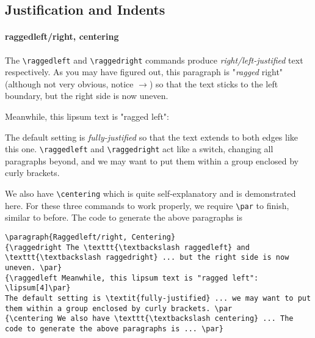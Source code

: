 \subsection{Justification and Indents}

\paragraph{raggedleft/right, centering}
{\raggedright The \texttt{\textbackslash raggedleft} and \texttt{\textbackslash raggedright} commands produce \textit{right/left-justified} text respectively. As you may have figured out, this paragraph is "\textit{ragged} right" (although not very obvious, notice $\rightarrow$) so that the text sticks to the left boundary, but the right side is now uneven. \par}
{\raggedleft Meanwhile, this lipsum text is "ragged left": \lipsum[4]\par}
The default setting is \textit{fully-justified} so that the text extends to both edges like this one. \texttt{\textbackslash raggedleft} and \texttt{\textbackslash raggedright} act like a switch, changing all paragraphs beyond, and we may want to put them within a group enclosed by curly brackets. \par
{\centering We also have \texttt{\textbackslash centering} which is quite self-explanatory and is demonstrated here. For these three commands to work properly, we require \texttt{\textbackslash par} to finish, similar to before. The code to generate the above paragraphs is \par}
\begin{lstlisting}
\paragraph{Raggedleft/right, Centering}
{\raggedright The \texttt{\textbackslash raggedleft} and \texttt{\textbackslash raggedright} ... but the right side is now uneven. \par}
{\raggedleft Meanwhile, this lipsum text is "ragged left": \lipsum[4]\par}
The default setting is \textit{fully-justified} ... we may want to put them within a group enclosed by curly brackets. \par
{\centering We also have \texttt{\textbackslash centering} ... The code to generate the above paragraphs is ... \par}
\end{lstlisting}

